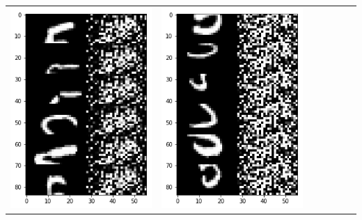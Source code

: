 \documentclass[12pt]{report} %
\begin{document}
\begin{tabular}{m{0.7cm}m{2.4cm}m{2.4cm}m{2.4cm}m{2.4cm}m{2.4cm}m{2.4cm}}
	\includegraphics[scale=0.3]{pictures/M2_5_up.png} & \includegraphics[scale=0.3]{pictures/M2_5_down.png}\\

\end{tabular}
\end{document}
